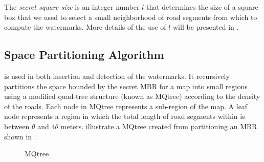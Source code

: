 The {\em secret square size} is an integer number $l$ that determines the size of a square box that we
used to select a small neighborhood of road segments from which to compute the watermarks.
More details of the use of $l$ will be presented in . 

\subsection{Space Partitioning Algorithm}

 is used in both insertion and detection 
of the watermarks. 
It recursively partitions the space bounded by the secret MBR for a map
into small regions using a modified quad-tree
structure (known as MQtree) according to the 
density of the roads. Each node in MQtree represents a sub-region of the map.
A leaf node represents a region in which the total length of road segments
within is between $\theta$ and $4\theta$ meters. %
 illustrate a MQtree created from partitioning an MBR
shown in . 


\begin{figure}[th]
\centering
{}
\caption{MQtree}
\label{fig:quadtree}
\end{figure}

